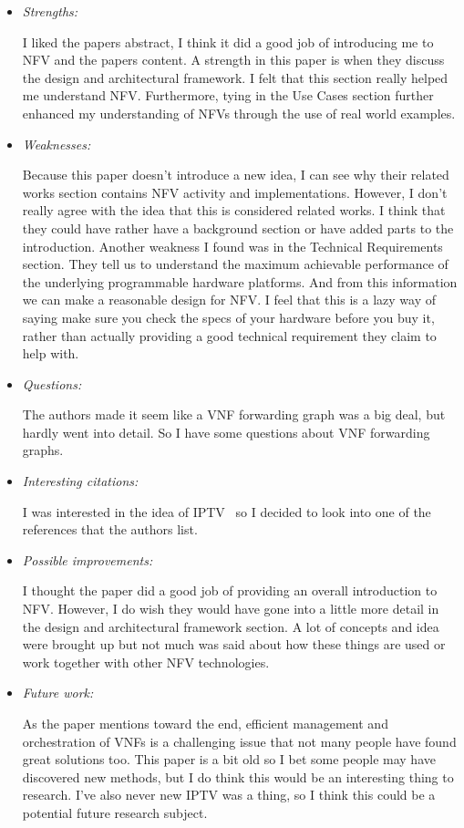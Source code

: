 \documentclass[letterpaper,twocolumn,10pt]{article}
\begin{document}
\begin{itemize}

\item {\it Strengths:} 

I liked the papers abstract, I think it did a good job of introducing me to NFV and the papers content.  
A strength in this paper is when they discuss the design and architectural framework. I felt that this section
really helped me understand NFV. Furthermore, tying in the Use Cases section further enhanced my 
understanding of NFVs through the use of real world examples. 

\item {\it Weaknesses:} 

Because this paper doesn't introduce a new idea, I can see why their related works section contains
NFV activity and implementations. However, I don't really agree with the idea that this is considered
related works. I think that they could have rather have a background section or have added parts to 
the introduction. Another weakness I found was in the Technical Requirements section. They tell us
to understand the maximum achievable performance of the underlying programmable hardware 
platforms. And from this information we can make a reasonable design for NFV. I feel that this is a lazy 
way of saying make sure you check the specs of your hardware before you buy it, rather than actually
providing a good technical requirement they claim to help with. 

\item {\it Questions:} 

The authors made it seem like a VNF forwarding graph was a big deal, but hardly went into detail. So 
I have some questions about VNF forwarding graphs. 

\item {\it Interesting citations:} 

I was interested in the idea of IPTV~\cite{iptv} so I decided to look into one of the references that the authors list. 

\item {\it Possible improvements:} 

I thought the paper did a good job of providing an overall introduction to NFV. However, I do wish
they would have gone into a little more detail in the design and architectural framework section. A 
lot of concepts and idea were brought up but not much was said about how these things are used 
or work together with other NFV technologies. 

\item {\it Future work:} 

As the paper mentions toward the end, efficient management and orchestration of VNFs is a 
challenging issue that not many people have found great solutions too. This paper is a bit old 
so I bet some people may have discovered new methods, but I do think this would be an interesting
thing to research. I've also never new IPTV was a thing, so I think this could be a potential future 
research subject. 

\end{itemize}

{
  \small 
  
  
}
\end{document}
